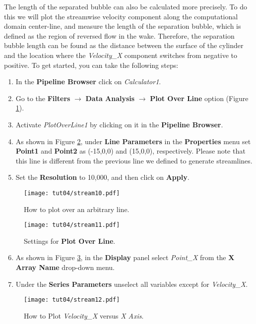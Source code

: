 The length of the separated bubble can also be calculated more precisely. To do this we will plot the streamwise velocity component along the computational domain center-line, and measure the length of the separation bubble, which is defined as the region of reversed flow in the wake. Therefore, the separation bubble length can be found as the distance between the surface of the cylinder and the location where the \textit{Velocity\_X} component switches from negative to positive. To get started, you can take the following steps: 
\begin{enumerate}[label=\arabic*)]
	\setcounter{enumi}{0}
	\item In the \textbf{Pipeline Browser} click on \textit{Calculator1}.
	\item Go to the \textbf{Filters} $\rightarrow$ \textbf{Data Analysis} $\rightarrow$ \textbf{Plot Over Line} option (Figure \ref{fig4:stream10_4}).
	\item Activate \textit{PlotOverLine1} by clicking on it in the \textbf{Pipeline Browser}.
	\item As shown in Figure \ref{fig4:stream11_4}, under \textbf{Line Parameters} in the \textbf{Properties} menu set \textbf{Point1} and \textbf{Point2} as (-15,0,0) and (15,0,0), respectively. Please note that this line is different from the previous line we defined to generate streamlines.
	\item Set the \textbf{Resolution} to 10,000, and then click on \textbf{Apply}.	
\end{enumerate}
\begin{figure}[ht]
    \centering
    \texttt{[image: tut04/stream10.pdf]}
    \caption{How to plot over an arbitrary line.}
    \label{fig4:stream10_4}
\end{figure}
\begin{figure}[H]
    \centering
    \texttt{[image: tut04/stream11.pdf]}
    \caption{Settings for \textbf{Plot Over Line}.}
    \label{fig4:stream11_4}
\end{figure}
\begin{enumerate}[label=\arabic*)]
	\setcounter{enumi}{5}
	\item As shown in Figure \ref{fig4:stream12_4}, in the \textbf{Display} panel select \textit{Point\_X} from the \textbf{X Array Name} drop-down menu.
	\item Under the \textbf{Series Parameters} unselect all variables except for \textit{Velocity\_X}.	
\end{enumerate}
\begin{figure}[ht]
    \centering
    \texttt{[image: tut04/stream12.pdf]}
    \caption{How to Plot \textit{Velocity\_X} versus \textit{X Axis}.}
    \label{fig4:stream12_4}
\end{figure}
